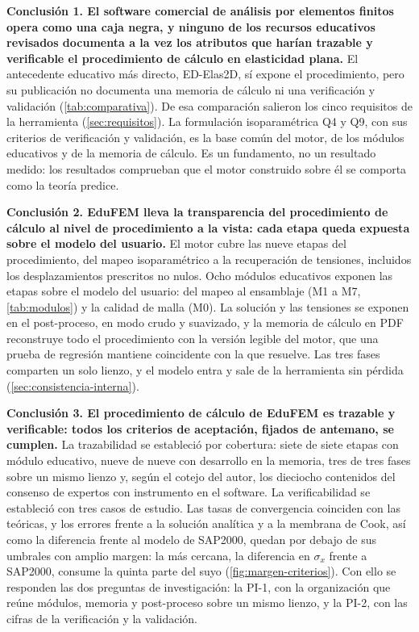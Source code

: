 \textbf{Conclusión 1. El software comercial de análisis por elementos finitos opera como una caja negra, y ninguno de los recursos educativos revisados documenta a la vez los atributos que harían trazable y verificable el procedimiento de cálculo en elasticidad plana.} El antecedente educativo más directo, ED-Elas2D, sí expone el procedimiento, pero su publicación no documenta una memoria de cálculo ni una verificación y validación (\autoref{tab:comparativa}). De esa comparación salieron los cinco requisitos de la herramienta (\autoref{sec:requisitos}). La formulación isoparamétrica Q4 y Q9, con sus criterios de verificación y validación, es la base común del motor, de los módulos educativos y de la memoria de cálculo. Es un fundamento, no un resultado medido: los resultados comprueban que el motor construido sobre él se comporta como la teoría predice.

\textbf{Conclusión 2. EduFEM lleva la transparencia del procedimiento de cálculo al nivel de procedimiento a la vista: cada etapa queda expuesta sobre el modelo del usuario.} El motor cubre las nueve etapas del procedimiento, del mapeo isoparamétrico a la recuperación de tensiones, incluidos los desplazamientos prescritos no nulos. Ocho módulos educativos exponen las etapas sobre el modelo del usuario: del mapeo al ensamblaje (M1 a M7, \autoref{tab:modulos}) y la calidad de malla (M0). La solución y las tensiones se exponen en el post-proceso, en modo crudo y suavizado, y la memoria de cálculo en PDF reconstruye todo el procedimiento con la versión legible del motor, que una prueba de regresión mantiene coincidente con la que resuelve. Las tres fases comparten un solo lienzo, y el modelo entra y sale de la herramienta sin pérdida (\autoref{sec:consistencia-interna}).

\textbf{Conclusión 3. El procedimiento de cálculo de EduFEM es trazable y verificable: todos los criterios de aceptación, fijados de antemano, se cumplen.} La trazabilidad se estableció por cobertura: siete de siete etapas con módulo educativo, nueve de nueve con desarrollo en la memoria, tres de tres fases sobre un mismo lienzo y, según el cotejo del autor, los dieciocho contenidos del consenso de expertos con instrumento en el software. La verificabilidad se estableció con tres casos de estudio. Las tasas de convergencia coinciden con las teóricas, y los errores frente a la solución analítica y a la membrana de Cook, así como la diferencia frente al modelo de SAP2000, quedan por debajo de sus umbrales con amplio margen: la más cercana, la diferencia en $\sigma_x$ frente a SAP2000, consume la quinta parte del suyo (\autoref{fig:margen-criterios}). Con ello se responden las dos preguntas de investigación: la PI-1, con la organización que reúne módulos, memoria y post-proceso sobre un mismo lienzo, y la PI-2, con las cifras de la verificación y la validación.

